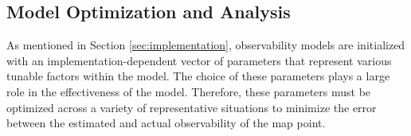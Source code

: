 \subsection{Model Optimization and Analysis}

As mentioned in Section \ref{sec:implementation}, observability models are initialized with an implementation-dependent vector of parameters that represent various tunable factors within the model. The choice of these parameters plays a large role in the effectiveness of the model. Therefore, these parameters must be optimized across a variety of representative situations to minimize the error between the estimated and actual observability of the map point. 

\subsubsection{}